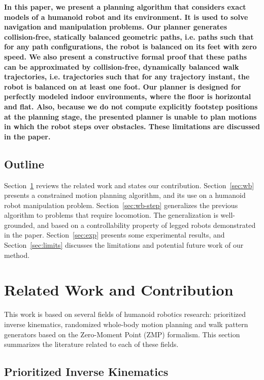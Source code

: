 \documentclass{article}
\begin{document}
\textbf{In this paper, we present a planning algorithm that considers exact models of a humanoid
robot and its environment. It is used to solve navigation and manipulation problems. Our planner 
generates collision-free, statically balanced
geometric paths, i.e. paths such that for any path configurations, the robot is balanced on its
feet with zero speed. We also present a constructive formal proof that these paths can be
approximated by collision-free, dynamically balanced walk trajectories, i.e. trajectories such
that for any trajectory instant, the robot is balanced on at least one foot. Our planner is designed for perfectly modeled indoor
environments, where the floor is horizontal and flat. Also, because we do not compute explicitly footstep
positions at the planning stage, the presented planner is unable to plan motions in which the
robot steps over obstacles. These limitations are discussed in the paper.}


\subsection{Outline}
Section~\ref{sec:related} reviews the related work and states our contribution. 
Section~\ref{sec:wb} presents a constrained motion planning algorithm, and its
use on a humanoid robot manipulation problem. Section~\ref{sec:wb-step} generalizes
the previous algorithm to problems that require locomotion. The generalization is
well-grounded, and
based on a controllability property of legged robots demonstrated in the paper. 
Section~\ref{sec:exp} presents some experimental results, and 
Section~\ref{sec:limits} discusses the limitations and potential future work of our
method.


\section{Related Work and Contribution}
\label{sec:related}


This work is based on several fields of humanoid robotics
research: prioritized inverse kinematics, randomized  whole-body  motion
planning and walk pattern generators based on the Zero-Moment
Point (ZMP) formalism. This section summarizes the literature related to each of 
these fields.

\subsection{Prioritized Inverse Kinematics}
\end{document}
